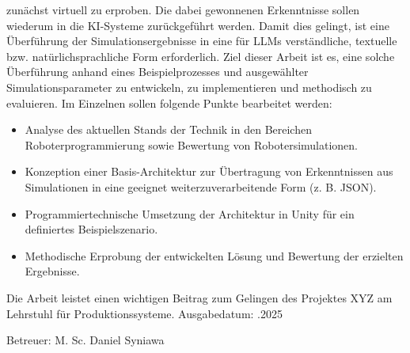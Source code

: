 \begin{titlepage}
  zunächst virtuell zu erproben. Die dabei gewonnenen Erkenntnisse
  sollen wiederum in die KI-Systeme zurückgeführt werden. Damit dies
  gelingt, ist eine Überführung der Simulationsergebnisse in eine für
  LLMs verständliche, textuelle bzw. natürlichsprachliche Form erforderlich.
  \bigbreak
  Ziel dieser Arbeit ist es, eine solche Überführung anhand eines
  Beispielprozesses und ausgewählter Simulationsparameter zu
  entwickeln, zu implementieren und methodisch zu evaluieren.
  \bigbreak
  Im Einzelnen sollen folgende Punkte bearbeitet werden:
  \begin{itemize}
    \item Analyse des aktuellen Stands der Technik in den Bereichen
      Roboterprogrammierung sowie Bewertung von Robotersimulationen.
    \item Konzeption einer Basis-Architektur zur Übertragung von
      Erkenntnissen aus Simulationen in eine geeignet
      weiterzuverarbeitende Form (z. B. JSON).
    \item Programmiertechnische Umsetzung der Architektur in Unity
      für ein definiertes Beispielszenario.
    \item Methodische Erprobung der entwickelten Lösung und Bewertung
      der erzielten Ergebnisse.
  \end{itemize}
  \bigbreak
  Die Arbeit leistet einen wichtigen Beitrag zum Gelingen des
  Projektes XYZ am Lehrstuhl
  für Produktionssysteme.
  \bigbreak
  Ausgabedatum: .2025\par
  Betreuer: M. Sc. Daniel Syniawa

\end{titlepage}
